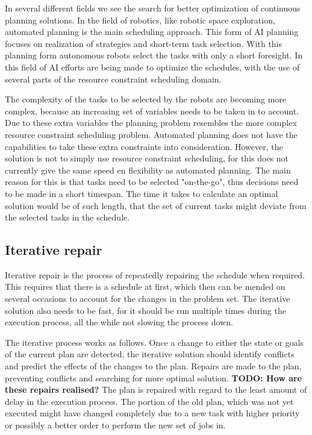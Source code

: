 \documentclass{article}
\newcommand{\TODO}[1]{{\color{red}\textbf{TODO: #1}}}
\begin{document}
In several different fields we see the search for better optimization of continuous planning solutions.
In the field of robotics, like robotic space exploration, automated planning is the main scheduling approach.
This form of AI planning focuses on realization of strategies and short-term task selection.
With this planning form autonomous robots select the tasks with only a short foresight.
In this field of AI efforts are being made to optimize the schedules, with the use of several parts of the resource constraint scheduling domain.
\cite{smith00}

The complexity of the tasks to be selected by the robots are becoming more complex, because an increasing set of variables needs to be taken in to account.
Due to these extra variables the planning problem resembles the more complex resource constraint scheduling problem.
Automated planning does not have the capabilities to take these extra constraints into consideration.
However, the solution is not to simply use resource constraint scheduling, for this does not currently give the same speed en flexibility as automated planning.
The main reason for this is that tasks need to be selected "on-the-go", thus decisions need to be made in a short timespan.
The time it takes to calculate an optimal solution would be of such length, that the set of current tasks might deviate from the selected tasks in the schedule.

\subsection{Iterative repair}
Iterative repair is the process of repeatedly repairing the schedule when required.
This requires that there is a schedule at first, which then can be mended on several occasions to account for the changes in the problem set.
The iterative solution also needs to be fast, for it should be run multiple times during the execution process, all the while not slowing the process down.

The iterative process works as follows.
Once a change to either the state or goals of the current plan are detected, the iterative solution should identify conflicts and predict the effects of the changes to the plan.
Repairs are made to the plan, preventing conflicts and searching for more optimal solution. \TODO{How are these repairs realised?}
The plan is repaired with regard to the least amount of delay in the execution process.
The portion of the old plan, which was not yet executed might have changed completely due to a new task with higher priority or possibly a better order to perform the new set of jobs in.
\cite{chien00}
\end{document}
